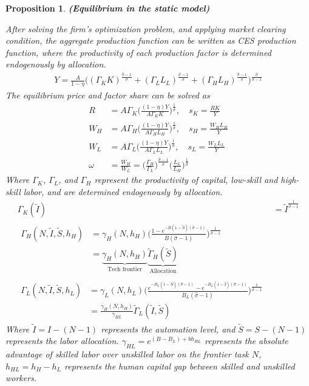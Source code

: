 \documentclass[12pt]{article}
\newtheorem{proposition}{Proposition}
\begin{document}
\begin{proposition}{\bf (Equilibrium in the static model)}

After solving the firm's optimization problem, and applying market clearing condition, the aggregate production function can be written as CES production function, where the productivity of each production factor is determined endogenously by allocation. 
\begin{align}
\label{output}
Y = \frac{A}{1-\eta}\Big((\Gamma_KK)^{\frac{\hat{\sigma}-1}{\hat{\sigma}}}+(\Gamma_LL_L)^{\frac{\hat{\sigma}-1}{\hat{\sigma}}}+(\Gamma_HL_H)^{\frac{\hat{\sigma}-1}{\hat{\sigma}}}\Big)^{\frac{\hat{\sigma}}{\hat{\sigma}-1}}
\end{align}
The equilibrium price and factor share can be solved as
\begin{align*}
R &=A\Gamma_K\Big(\frac{(1-\eta)Y}{A\Gamma_KK}\Big)^{\frac{1}{\hat{\sigma}}},   \quad s_K= \frac{RK}{Y} \\
W_H &=A\Gamma_H\Big(\frac{(1-\eta)Y}{A\Gamma_HL_H}\Big)^{\frac{1}{\hat{\sigma}}},  \quad s_H = \frac{W_HL_H}{Y} \\
W_L &= A\Gamma_L\Big(\frac{(1-\eta)Y}{A\Gamma_LL_L}\Big)^{\frac{1}{\hat{\sigma}}},  \quad s_L = \frac{W_LL_L}{Y}  \\
\omega &= \frac{W_H}{W_L} = \Big(\frac{\Gamma_H}{\Gamma_L} \Big)^{\frac{\hat{\sigma}-1}{\hat{\sigma}}}\Big(\frac{L_L}{L_H} \Big)^{\frac{1}{\hat{\sigma}}}
\end{align*}
Where $\Gamma_K$, $\Gamma_L$, and $\Gamma_H$ represent the productivity of capital, low-skill and high-skill labor, and are determined endogenously by allocation.
\begin{align}
\label{Gamma_K}
\Gamma_K(\tilde{I}) &= \tilde{I}^{\frac{1}{\hat{\sigma}-1}} \\
\label{Gamma_H}
\begin{split}
\Gamma_H(N,\tilde{I},\tilde{S},h_H)  &= \gamma_H(N,h_H)\Big(\frac{1-e^{-B(1-\tilde{S})(\hat{\sigma}-1)}}{B(\hat{\sigma}-1)}\Big)^{\frac{1}{\hat{\sigma}-1}} \\
&= \underbrace{\gamma_H(N,h_H)}_{\text{Tech frontier}}\underbrace{\tilde{\Gamma}_H(\tilde{S})}_{\text{Allocation}}
\end{split}
\\
\label{Gamma_L}
\begin{split}
\Gamma_L(N,\tilde{I},\tilde{S},h_L)  &= \gamma_L(N,h_L)\Big(\frac{e^{-B_L(1-\tilde{S})(\hat{\sigma}-1)}-e^{-B_L(1-\tilde{I})(\hat{\sigma}-1)}}{B_L(\hat{\sigma}-1)}\Big)^{\frac{1}{\hat{\sigma}-1}}\\
 &=\frac{\gamma_H(N,h_H)}{\gamma_{HL}}\tilde{\Gamma}_L(\tilde{I},\tilde{S})
 \end{split}
\end{align}
Where $\tilde{I} = I-(N-1)$ represents the automation level, and $\tilde{S} = S-(N-1)$ represents the labor allocation. $\gamma_{HL} = e^{(B-B_L)+bh_{HL}}$ represents the absolute advantage of skilled labor over unskilled labor on the frontier task $N$, $h_{HL} = h_H-h_L$ represents the human capital gap between skilled and unskilled workers.  
\end{proposition}
\end{document}
